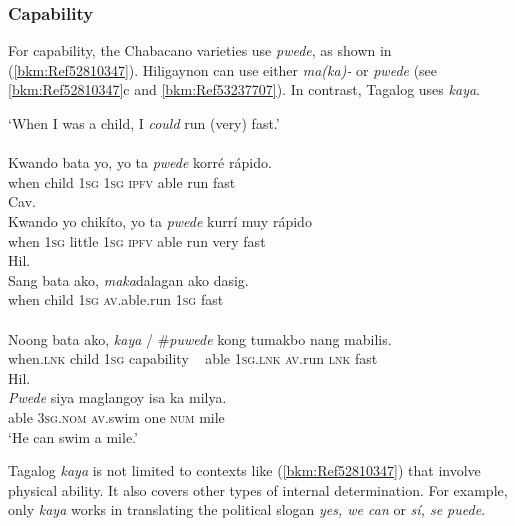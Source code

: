 \documentclass[output=paper,colorlinks,citecolor=brown]{langscibook}
\begin{document}
 \subsubsection{Capability}


For capability, the Chabacano varieties use \textit{pwede}, as shown in (\ref{bkm:Ref52810347}). Hiligaynon can use either \textit{ma(ka)-} or \textit{pwede} (see \ref{bkm:Ref52810347}c and \ref{bkm:Ref53237707}). In contrast, Tagalog uses \textit{kaya}.

\ea
{\label{bkm:Ref52810347}
‘When I was a child, I \textit{could} run (very) fast.’}\\
\\
\gll Kwando  bata yo, yo ta \textit{pwede} korré rápido.\\
     when child 1\textsc{sg} 1\textsc{sg} \textsc{ipfv} able run fast\\
\ex
{Cav.}\\
\gll Kwando yo chikíto,        yo ta \textit{pwede} kurrí muy rápido\\
     when  1\textsc{sg} little 1\textsc{sg} \textsc{ipfv} able run very fast\\
\ex
{Hil.}\\
\gll    Sang bata ako, \textit{maka}dalagan ako dasig.\\
     when child 1\textsc{sg} \textsc{av}.able.run 1\textsc{sg} fast  \\
     
\\ {\label{bkm:Ref53237707}}
\gll Noong         bata ako, \textit{kaya} / {\#}\textit{puwede} kong tumakbo nang mabilis.\\
 when.\textsc{lnk} child 1\textsc{sg} capability ~ able 1\textsc{sg.lnk} \textsc{av}.run \textsc{lnk} fast\\
\z
\ex
{\label{ex:lesho:20}Hil.}\\
\gll \textit{Pwede} siya maglangoy isa ka milya.\\
       able 3\textsc{sg.nom} \textsc{av}.swim one \textsc{num} mile\\
\glt `He can swim a mile.'\\
\z



Tagalog \textit{kaya} is not limited to contexts like (\ref{bkm:Ref52810347}) that involve physical ability. It also covers other types of internal determination. For example, only \textit{kaya} works in translating the political slogan \textit{yes, we can} or \textit{sí, se puede}.
\end{document}
